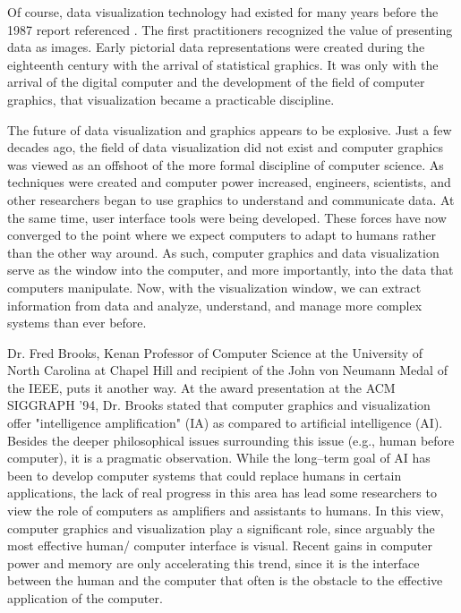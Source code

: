 Of course, data visualization technology had existed for many years before the 1987 report referenced \cite{Tufte83}. The first practitioners recognized the value of presenting data as images. Early pictorial data representations were created during the eighteenth century with the arrival of statistical graphics. It was only with the arrival of the digital computer and the development of the field of computer graphics, that visualization became a practicable discipline.

The future of data visualization and graphics appears to be explosive. Just a few decades ago, the field of data visualization did not exist and computer graphics was viewed as an offshoot of the more formal discipline of computer science. As techniques were created and computer power increased, engineers, scientists, and other researchers began to use graphics to understand and communicate data. At the same time, user interface tools were being developed. These forces have now converged to the point where we expect computers to adapt to humans rather than the other way around. As such, computer graphics and data visualization serve as the window into the computer, and more importantly, into the data that computers manipulate. Now, with the visualization window, we can extract information from data and analyze, understand, and manage more complex systems than ever before.

Dr. Fred Brooks, Kenan Professor of Computer Science at the University of North Carolina at Chapel Hill and recipient of the John von Neumann Medal of the IEEE, puts it another way. At the award presentation at the ACM SIGGRAPH '94, Dr. Brooks stated that computer graphics and visualization offer "intelligence amplification" (IA) as compared to artificial intelligence (AI). Besides the deeper philosophical issues surrounding this issue (e.g., human before computer), it is a pragmatic observation. While the long--term goal of AI has been to develop computer systems that could replace humans in certain applications, the lack of real progress in this area has lead some researchers to view the role of computers as amplifiers and assistants to humans. In this view, computer graphics and visualization play a significant role, since arguably the most effective human/ computer interface is visual. Recent gains in computer power and memory are only accelerating this trend, since it is the interface between the human and the computer that often is the obstacle to the effective application of the computer.

